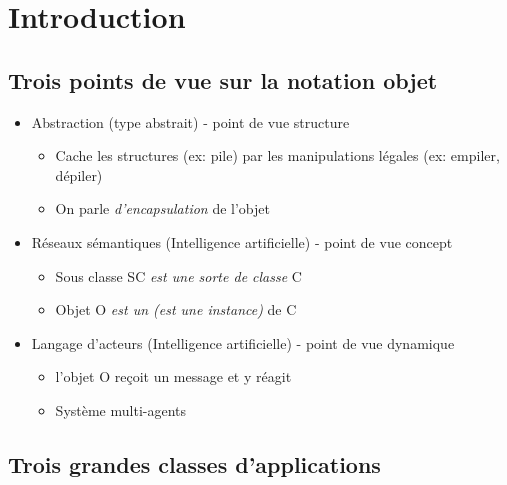 \documentclass{article}
\begin{document}
\section{Introduction}

\subsection{Trois points de vue sur la notation objet}

\begin{itemize}
	\item Abstraction (type abstrait) - point de vue structure
		\begin{itemize}
			\item Cache les structures (ex: pile) par les manipulations légales (ex: empiler,
				dépiler)
			\item On parle \emph{d'encapsulation} de l'objet
		\end{itemize}
	\item Réseaux sémantiques (Intelligence artificielle) - point de vue concept
	\begin{itemize}
		\item Sous classe SC \emph{est une sorte de classe} C
		\item Objet O \emph{est un (est une instance)} de C
	\end{itemize}
	\item Langage d'acteurs (Intelligence artificielle) - point de vue dynamique
	\begin{itemize}
		\item l'objet O reçoit un message et y réagit
		\item Système multi-agents
	\end{itemize}
\end{itemize}

\subsection{Trois grandes classes d'applications}
\end{document}
